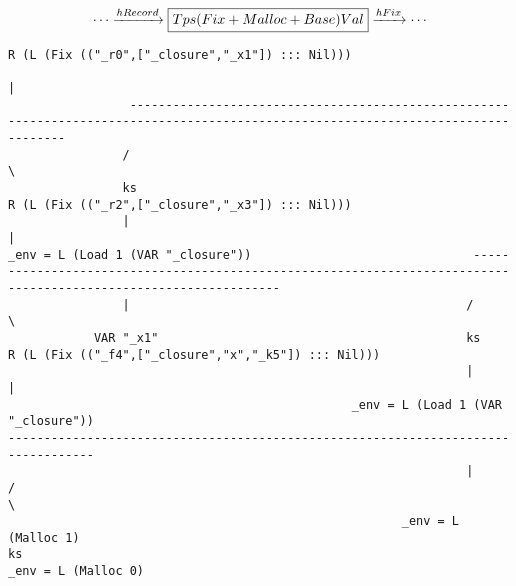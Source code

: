\begin{landscape}
\begin{gather*}
  \cdots \xrightarrow{hRecord} \boxed{Tps (Fix + Malloc + Base) Val} \xrightarrow{hFix} \cdots
\end{gather*}
\begin{lstlisting}[basicstyle=\fontsize{5.5}{6.5}\selectfont\ttfamily]
                                                                                                           R (L (Fix (("_r0",["_closure","_x1"]) ::: Nil)))
                                                                                                                                  |
                 -----------------------------------------------------------------------------------------------------------------------------------
                /                                                                                                                                   \
                ks                                                                                                           R (L (Fix (("_r2",["_closure","_x3"]) ::: Nil)))
                |                                                                                                                                   |
_env = L (Load 1 (VAR "_closure"))                               -----------------------------------------------------------------------------------------------------------------
                |                                               /                                                                                                                 \
            VAR "_x1"                                           ks                                                                                       R (L (Fix (("_f4",["_closure","x","_k5"]) ::: Nil)))
                                                                |                                                                                                                 |
                                                _env = L (Load 1 (VAR "_closure"))                                                                  ----------------------------------------------------------------------------------
                                                                |                                                                                  /                                                                                  \
                                                       _env = L (Malloc 1)                                                                         ks                                                                        _env = L (Malloc 0)

\end{lstlisting}
\end{landscape}
